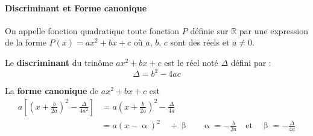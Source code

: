 \documentclass[main.tex]{subfiles}
\begin{document}
\paragraph{Discriminant et Forme canonique}

\begin{definition}
	On appelle fonction quadratique toute fonction $P$ définie sur $\mathbb{R}$ par une expression de la forme $P(x)=ax^2+bx+c$ où $a$, $b$, $c$ sont des réels et $a \neq 0$. 
\end{definition}

\begin{definition}
	Le \textbf{discriminant} du trinôme $ax^2+bx+c$ est le réel noté $\Delta$ défini par :
	\setlength{\abovedisplayskip}{3pt}
	\setlength{\belowdisplayskip}{3pt}
	 $$\Delta=b^2-4ac$$
\end{definition}

\begin{definition}
	La \textbf{forme canonique} de $ax^2+bx+c$ est
	\setlength{\abovedisplayskip}{3pt}
	\setlength{\belowdisplayskip}{3pt}
	 \begin{align*}
	 	a\left[\left(x+\frac{b}{2a}\right)^2-\frac{\Delta}{4a^2}\right]&=a\left(x+\frac{b}{2a}\right)^2-\frac{\Delta}{4a}\\
	 	&= a(x-\upalpha)^2\quad +\upbeta && \upalpha=- \frac{b}{2a} \quad\text{et}\quad \upbeta=- \frac{\Delta}{4a} 
	 	\end{align*}
\end{definition}
\end{document}
